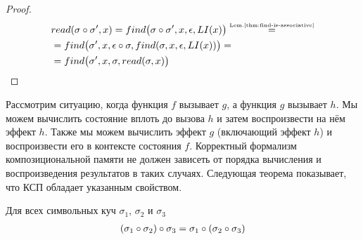 \begin{proof}
\allowdisplaybreaks
\begin{align*}
&read(\sigma\circ\sigma',x) = find\big(\sigma\circ\sigma',x,\epsilon,LI(x)\big) \mathrel{\stackrel{\mbox{\normalfont\tiny Lem.\ref{thm:find-is-associative}}}{=}}\\
&=find\big(\sigma',x,\epsilon\circ\sigma,find(\sigma,x,\epsilon,LI(x))\big)=\\
&=find\big(\sigma',x,\sigma,read(\sigma,x)\big)
\end{align*}
\end{proof}
%
Рассмотрим ситуацию, когда функция $f$ вызывает $g$, а функция $g$ вызывает $h$. Мы можем вычислить состояние вплоть до вызова $h$ и затем воспроизвести на нём эффект $h$. Также мы можем вычислить эффект $g$ (включающий эффект $h$) и воспроизвести его в контексте состояния $f$. Корректный формализм композициональной памяти не должен зависеть от порядка вычисления и воспроизведения результатов в таких случаях. Следующая теорема показывает, что КСП обладает указанным свойством.
%
\begin{thm}\label{thm:state-composition-is-associative}
Для всех символьных куч $\sigma_1$, $\sigma_2$ и $\sigma_3$
\begin{align}\notag
	(\sigma_1\circ\sigma_2)\circ\sigma_3 = \sigma_1\circ(\sigma_2\circ\sigma_3)
\end{align}
\end{thm}
